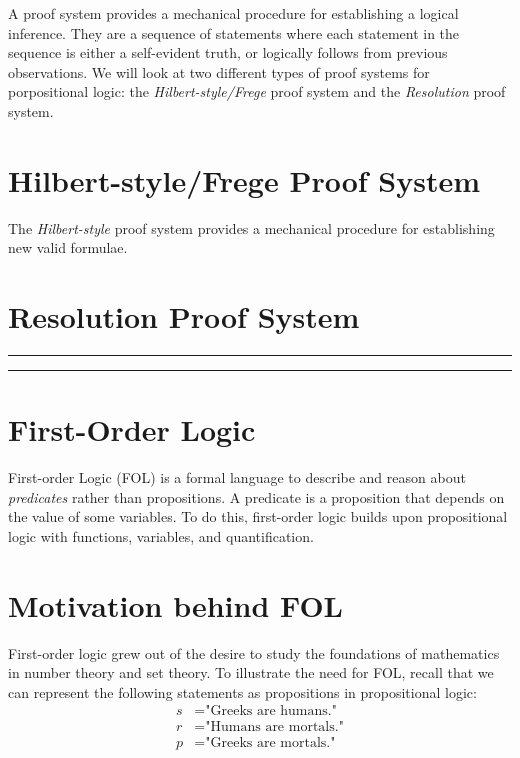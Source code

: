 \documentclass[11pt,usenames, dvipsnames]{article}
\begin{document}
A proof system provides a mechanical procedure for establishing a logical inference. They are a sequence of statements where each statement in the sequence is either a self-evident truth, or logically follows from previous observations. We will look at two different types of proof systems for porpositional logic: the \emph{Hilbert-style/Frege} proof system and the \emph{Resolution} proof system.

\section*{\large \centering Hilbert-style/Frege Proof System}
\noindent

The \emph{Hilbert-style} proof system provides a mechanical procedure for establishing new valid formulae.

\section*{\large \centering Resolution Proof System}
\noindent


\vspace{5truemm}
\hrule
\hrule

\section*{\large \centering First-Order Logic}
\noindent

First-order Logic (FOL) is a formal language to describe and reason about \emph{predicates} rather than propositions. A predicate is a proposition that depends on the value of some variables. To do this, first-order logic builds upon propositional logic with functions, variables, and quantification.

\section*{\large \centering Motivation behind FOL}
\noindent

First-order logic grew out of the desire to study the foundations of mathematics in number theory and set theory. To illustrate the need for FOL, recall that we can represent the following statements as propositions in propositional logic:
\begin{align*}
  s &= \text{"Greeks are humans."}
  \\
  r &= \text{"Humans are mortals."}
  \\
  p &= \text{"Greeks are mortals."}
\end{align*}
\end{document}

